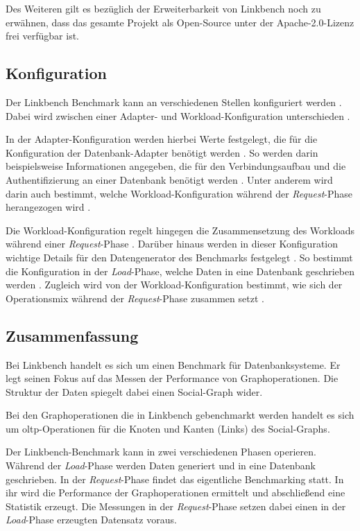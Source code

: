 Des Weiteren gilt es bezüglich der Erweiterbarkeit von Linkbench noch zu erwähnen, dass das gesamte Projekt als Open-Source unter der Apache-2.0-Lizenz frei verfügbar ist.

\subsection{Konfiguration}
Der Linkbench Benchmark kann an verschiedenen Stellen konfiguriert werden \cite{linkbench_paper,fb_linkbench_github}. Dabei wird zwischen einer Adapter- und Workload-Konfiguration unterschieden \cite{fb_linkbench_github}. 

In der Adapter-Konfiguration werden hierbei Werte festgelegt, die für die Konfiguration der Datenbank-Adapter benötigt werden \cite{fb_linkbench_github}. So werden darin beispielsweise Informationen angegeben, die für den Verbindungsaufbau und die Authentifizierung an einer Datenbank benötigt werden \cite{fb_linkbench_github}. Unter anderem wird darin auch bestimmt, welche Workload-Konfiguration während der \textit{Request}-Phase herangezogen wird \cite{fb_linkbench_github}. 

Die Workload-Konfiguration regelt hingegen die Zusammensetzung des Workloads während einer \textit{Request}-Phase \cite{fb_linkbench_github}. Darüber hinaus werden in dieser Konfiguration wichtige Details für den Datengenerator des Benchmarks festgelegt \cite{fb_linkbench_github}. So bestimmt die Konfiguration in der \textit{Load}-Phase, welche Daten in eine Datenbank geschrieben werden \cite{fb_linkbench_github}. Zugleich wird von der Workload-Konfiguration bestimmt, wie sich der Operationsmix während der \textit{Request}-Phase zusammen setzt \cite{fb_linkbench_github}.

\subsection{Zusammenfassung}
Bei Linkbench handelt es sich um einen Benchmark für Datenbanksysteme. Er legt seinen Fokus auf das Messen der Performance von Graphoperationen. Die Struktur der Daten spiegelt dabei einen Social-Graph wider. 

Bei den Graphoperationen die in Linkbench gebenchmarkt werden handelt es sich um \acs{oltp}-Operationen für die Knoten und Kanten (Links) des Social-Graphs.

Der Linkbench-Benchmark kann in zwei verschiedenen Phasen operieren. Während der \textit{Load}-Phase werden Daten generiert und in eine Datenbank geschrieben. In der \textit{Request}-Phase findet das eigentliche Benchmarking statt. In ihr wird die Performance der Graphoperationen ermittelt und abschließend eine Statistik erzeugt. Die Messungen in der \textit{Request}-Phase setzen dabei einen in der \textit{Load}-Phase erzeugten Datensatz voraus. 


